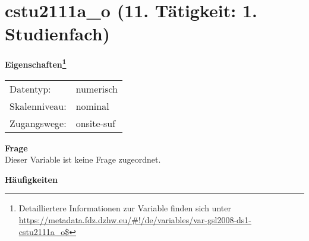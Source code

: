 
    \setcounter{footnote}{0}

    \vspace*{-1.8cm}
	\section{cstu2111a\_o (11. Tätigkeit: 1. Studienfach)}
	\label{section:cstu2111a_o}



    \vspace*{0.5cm}
    \noindent\textbf{Eigenschaften\footnote{Detailliertere Informationen zur Variable finden sich unter
		\url{https://metadata.fdz.dzhw.eu/\#!/de/variables/var-gsl2008-ds1-cstu2111a_o$}}}\\
	\begin{tabularx}{\hsize}{@{}lX}
	Datentyp: & numerisch \\
	Skalenniveau: & nominal \\
	Zugangswege: &
	  onsite-suf
 \\
    \end{tabularx}



		\vspace*{0.5cm}
		\noindent\textbf{Frage}\\
		Dieser Variable ist keine Frage zugeordnet.





        		\vspace*{0.5cm}
                \noindent\textbf{Häufigkeiten}

